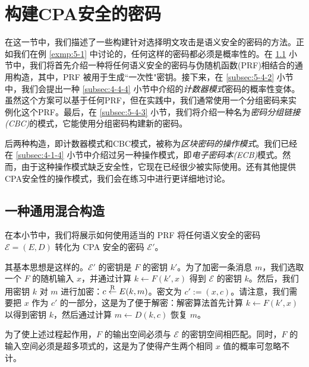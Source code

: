 \section{构建CPA安全的密码}

在这一节中，我们描述了一些构建针对选择明文攻击是语义安全的密码的方法。正如我们在例 \ref{exmp:5-1} 中讨论的，任何这样的密码都必须是概率性的。在 \ref{subsec:5-4-1} 小节中，我们将首先介绍一种将任何语义安全的密码与伪随机函数(PRF)相结合的通用构造，其中，PRF 被用于生成``一次性"密钥。接下来，在 \ref{subsec:5-4-2} 小节中，我们会提出一种 \ref{subsec:4-4-4} 小节中介绍的\emph{计数器模式}密码的概率性变体。虽然这个方案可以基于任何PRF，但在实践中，我们通常使用一个分组密码来实例化这个PRF。最后，在 \ref{subsec:5-4-3} 小节，我们将介绍一种名为\emph{密码分组链接(CBC)}的模式，它能使用分组密码构建新的密码。

后两种构造，即计数器模式和CBC模式，被称为\emph{区块密码的操作模式}。我们已经在 \ref{subsec:4-1-4} 小节中介绍过另一种操作模式，即\emph{电子密码本(ECB)}模式。然而，由于这种操作模式缺乏安全性，它现在已经很少被实际使用。还有其他提供CPA安全性的操作模式，我们会在练习中进行更详细地讨论。


\subsection{一种通用混合构造}\label{subsec:5-4-1}

在本小节中，我们将展示如何使用适当的 PRF 将任何语义安全的密码 $\mathcal{E}=(E,D)$ 转化为 CPA 安全的密码 $\mathcal{E}'$。

其基本思想是这样的。$\mathcal{E}'$ 的密钥是 $F$ 的密钥 $k'$。为了加密一条消息 $m$，我们选取一个 $F$ 的随机输入 $x$，并通过计算 $k\leftarrow F(k',x)$ 得到 $\mathcal{E}$ 的密钥 $k$。然后，我们用密钥 $k$ 对 $m$ 进行加密：$c\overset{\rm R}\leftarrow E(k,m)$。密文为 $c':=(x,c)$。请注意，我们需要把 $x$ 作为 $c'$ 的一部分，这是为了便于解密：解密算法首先计算 $k\leftarrow F(k',x)$ 以得到密钥 $k$，然后通过计算 $m\leftarrow D(k,c)$ 恢复 $m$。

为了使上述过程起作用，$F$ 的输出空间必须与 $\mathcal{E}$ 的密钥空间相匹配。同时，$F$ 的输入空间必须是超多项式的，这是为了使得产生两个相同 $x$  值的概率可忽略不计。

